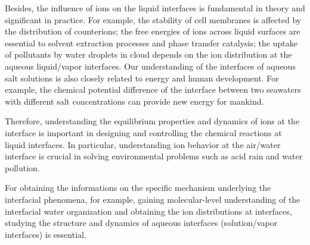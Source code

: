 Besides, the influence of ions on the liquid interfaces is fundamental in theory and significant in practice.
For example, the stability of cell membranes is affected by the distribution of counterions\cite{Veziriglu1990}; 
the free energies of ions across liquid surfaces are essential to solvent extraction processes and phase transfer catalysis\cite{Starks1994};
the uptake of pollutants by water droplets in cloud depends on the ion distribution at the aqueous liquid/vapor interfaces.
Our understanding of the interfaces of aqueous salt solutions is also closely related to energy and human development. 
For example, the chemical potential difference of the interface between two seawaters with different salt concentrations can provide new energy for mankind\cite{Pattle1954,Loeb1976}. 

Therefore, understanding the equilibrium properties and dynamics of ions at the interface is important in designing and controlling the chemical reactions at liquid interfaces\cite{Chang06}. In particular, understanding ion behavior at the air/water interface is crucial in solving environmental problems such as acid rain and water pollution\cite{Chang06}.


For obtaining the informations on the specific mechanism underlying the interfacial phenomena, for example,
gaining molecular-level understanding of the interfacial water organization and obtaining the ion distributions at interfaces,
studying the structure and dynamics of aqueous interfaces (solution/vapor interfaces) is essential.

